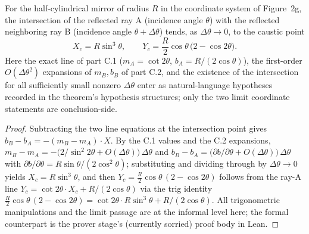 \begin{theorem}
\label{thm:IPhO2026Problems_problem_IPhO_2026_2_C_3:limitingIntersectionCoordinates}
For the half-cylindrical mirror of radius $R$ in the coordinate system of
Figure~2g, the intersection of the reflected ray A (incidence angle $\theta$)
with the reflected neighboring ray B (incidence angle $\theta+\Delta\theta$)
tends, as $\Delta\theta\to 0$, to the caustic point
\[
X_c = R\sin^3\theta, \qquad Y_c = \frac{R}{2}\cos\theta\,\bigl(2-\cos 2\theta\bigr).
\]
Here the exact line of part C.1 ($m_A = \cot 2\theta$,
$b_A = R/(2\cos\theta)$), the first-order $O(\Delta\theta^2)$ expansions of
$m_B, b_B$ of part C.2, and the existence of the intersection for all
sufficiently small nonzero $\Delta\theta$ enter as natural-language
hypotheses recorded in the theorem's hypothesis structures; only the two
limit coordinate statements are conclusion-side.
\end{theorem}
\begin{proof}
Subtracting the two line equations at the intersection point gives
$b_B - b_A = -(m_B - m_A)\cdot X$.  By the C.1 values and the C.2
expansions, $m_B - m_A = -\bigl(2/\sin^2 2\theta + O(\Delta\theta)\bigr)
\,\Delta\theta$ and
$b_B - b_A = \bigl(\partial b/\partial\theta + O(\Delta\theta)\bigr)
\,\Delta\theta$ with
$\partial b/\partial\theta = R\sin\theta/(2\cos^2\theta)$; substituting and
dividing through by $\Delta\theta \to 0$ yields
$X_c = R\sin^3\theta$, and then $Y_c = \frac{R}{2}\cos\theta\,(2-\cos 2\theta)$
follows from the ray-A line $Y_c = \cot 2\theta\cdot X_c + R/(2\cos\theta)$
via the trig identity
$\frac{R}{2}\cos\theta\,(2-\cos 2\theta)
= \cot 2\theta\cdot R\sin^3\theta + R/(2\cos\theta)$.
All trigonometric manipulations and the limit passage are at the informal
level here; the formal counterpart is the prover stage's (currently
sorried) proof body in Lean.
\end{proof}
